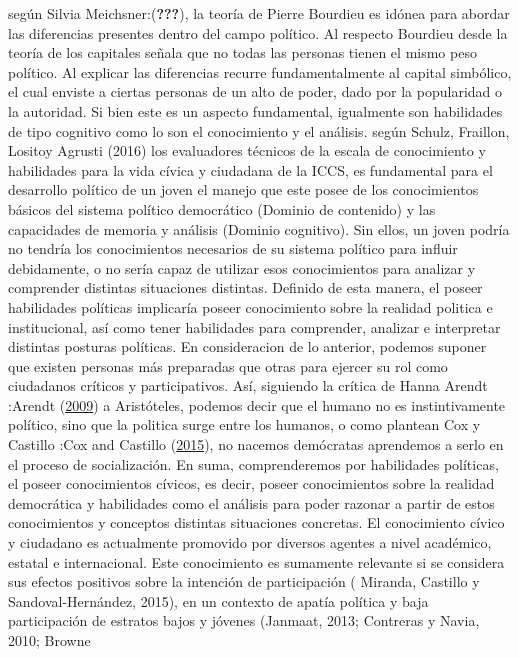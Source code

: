 \documentclass[
]{article}
\begin{document}
según Silvia Meichsner:({\textbf{???}}), la teoría de Pierre Bourdieu es
idónea para abordar las diferencias presentes dentro del campo político.
Al respecto Bourdieu desde la teoría de los capitales señala que no
todas las personas tienen el mismo peso político. Al explicar las
diferencias recurre fundamentalmente al capital simbólico, el cual
enviste a ciertas personas de un alto de poder, dado por la popularidad
o la autoridad. Si bien este es un aspecto fundamental, igualmente son
habilidades de tipo cognitivo como lo son el conocimiento y el análisis.
según Schulz, Fraillon, Lositoy Agrusti (2016) los evaluadores técnicos
de la escala de conocimiento y habilidades para la vida cívica y
ciudadana de la ICCS, es fundamental para el desarrollo político de un
joven el manejo que este posee de los conocimientos básicos del sistema
político democrático (Dominio de contenido) y las capacidades de memoria
y análisis (Dominio cognitivo). Sin ellos, un joven podría no tendría
los conocimientos necesarios de su sistema político para influir
debidamente, o no sería capaz de utilizar esos conocimientos para
analizar y comprender distintas situaciones distintas. Definido de esta
manera, el poseer habilidades políticas implicaría poseer conocimiento
sobre la realidad politica e institucional, así como tener habilidades
para comprender, analizar e interpretar distintas posturas políticas. En
consideracion de lo anterior, podemos suponer que existen personas más
preparadas que otras para ejercer su rol como ciudadanos críticos y
participativos. Así, siguiendo la crítica de Hanna Arendt :Arendt
(\protect\hyperlink{ref-arendtQueEsPolitica2009}{2009}) a Aristóteles,
podemos decir que el humano no es instintivamente político, sino que la
politica surge entre los humanos, o como plantean Cox y Castillo :Cox
and Castillo
(\protect\hyperlink{ref-coxAprendizajeCiudadaniaContextos2015}{2015}),
no nacemos demócratas aprendemos a serlo en el proceso de socialización.
En suma, comprenderemos por habilidades políticas, el poseer
conocimientos cívicos, es decir, poseer conocimientos sobre la realidad
democrática y habilidades como el análisis para poder razonar a partir
de estos conocimientos y conceptos distintas situaciones concretas. El
conocimiento cívico y ciudadano es actualmente promovido por diversos
agentes a nivel académico, estatal e internacional. Este conocimiento es
sumamente relevante si se considera sus efectos positivos sobre la
intención de participación ( Miranda, Castillo y Sandoval-Hernández,
2015), en un contexto de apatía política y baja participación de
estratos bajos y jóvenes (Janmaat, 2013; Contreras y Navia, 2010; Browne
\end{document}
